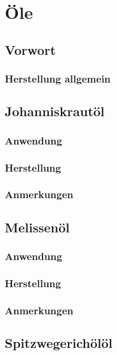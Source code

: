 \chapter{Öle}


\section{Vorwort}

\subsection{Herstellung allgemein}


\section{Johanniskrautöl}

\subsection{Anwendung}

\subsection{Herstellung}

\subsection{Anmerkungen}



\section{Melissenöl}

\subsection{Anwendung}

\subsection{Herstellung}

\subsection{Anmerkungen}




\section{Spitzwegerichölöl}

